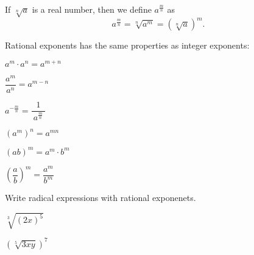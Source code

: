 

\begin{tcolorbox}[title=Definition and properties of rational exponents]
If $\sqrt[n]{a}$ is a real number, then we define $a^{\frac mn}$ as
\[a^{\frac mn}=\sqrt[n]{a^m}=(\sqrt[n]{a})^m.\]

Rational exponents has the same properties as integer exponents:

\begin{enumerate*}[label=\arabic*.,afterlabel={\quad}]
\item \parbox{0.25\textwidth}{$a^m\cdot a^n=a^{m+n}$}
\item \parbox{0.25\textwidth}{$\dfrac{a^m}{a^n}=a^{m-n}$}
\item \parbox{0.25\textwidth}{$a^{-\frac mn}=\dfrac{~1~}{~a^{\frac mn}~}$} 
\end{enumerate*}

\begin{enumerate*}[resume*]
\item \parbox{0.25\textwidth}{$(a^m)^n=a^{mn}$}
\item \parbox{0.25\textwidth}{$(ab)^m=a^m\cdot b^m$}
\item \parbox{0.25\textwidth}{$(\dfrac ab)^m=\dfrac{a^m}{b^m}$}
\end{enumerate*}
\end{tcolorbox}

\begin{exercise}
Write radical expressions with rational exponenets.
\\
\begin{enumerate*}[label={(\arabic*)~}]
\item $\sqrt[3]{(2x)^5}$  
\item $(\sqrt[5]{3xy})^7$\hfill\null
\end{enumerate*}
\end{exercise}

\vfill
\begin{center} \hfill
{}
\end{center}


